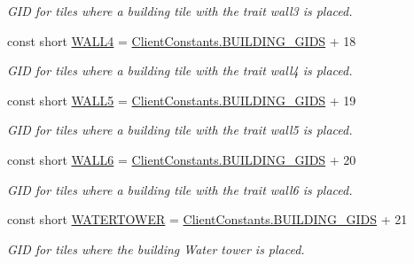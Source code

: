 \begin{DoxyCompactItemize}
\begin{DoxyCompactList}\small\item\em G\+I\+D for tiles where a building tile with the trait wall3 is placed. \end{DoxyCompactList}\item 
const short \hyperlink{classClient_1_1Common_1_1Constants_1_1BuildingGid_ae32db2141c8c89a5f169013d288bbaa6}{W\+A\+L\+L4} = \hyperlink{classClient_1_1Common_1_1Constants_1_1ClientConstants_ad2e944ac733f952d3d0c2e24fe5d14ad}{Client\+Constants.\+B\+U\+I\+L\+D\+I\+N\+G\+\_\+\+G\+I\+D\+S} + 18
\begin{DoxyCompactList}\small\item\em G\+I\+D for tiles where a building tile with the trait wall4 is placed. \end{DoxyCompactList}\item 
const short \hyperlink{classClient_1_1Common_1_1Constants_1_1BuildingGid_a02ed00c8a873b948ddbc108e5f6a97a4}{W\+A\+L\+L5} = \hyperlink{classClient_1_1Common_1_1Constants_1_1ClientConstants_ad2e944ac733f952d3d0c2e24fe5d14ad}{Client\+Constants.\+B\+U\+I\+L\+D\+I\+N\+G\+\_\+\+G\+I\+D\+S} + 19
\begin{DoxyCompactList}\small\item\em G\+I\+D for tiles where a building tile with the trait wall5 is placed. \end{DoxyCompactList}\item 
const short \hyperlink{classClient_1_1Common_1_1Constants_1_1BuildingGid_af82da441a2417d681d62e1edf3da9a40}{W\+A\+L\+L6} = \hyperlink{classClient_1_1Common_1_1Constants_1_1ClientConstants_ad2e944ac733f952d3d0c2e24fe5d14ad}{Client\+Constants.\+B\+U\+I\+L\+D\+I\+N\+G\+\_\+\+G\+I\+D\+S} + 20
\begin{DoxyCompactList}\small\item\em G\+I\+D for tiles where a building tile with the trait wall6 is placed. \end{DoxyCompactList}\item 
const short \hyperlink{classClient_1_1Common_1_1Constants_1_1BuildingGid_a700ea8d166e5210b1dea7f42506df381}{W\+A\+T\+E\+R\+T\+O\+W\+E\+R} = \hyperlink{classClient_1_1Common_1_1Constants_1_1ClientConstants_ad2e944ac733f952d3d0c2e24fe5d14ad}{Client\+Constants.\+B\+U\+I\+L\+D\+I\+N\+G\+\_\+\+G\+I\+D\+S} + 21
\begin{DoxyCompactList}\small\item\em G\+I\+D for tiles where the building Water tower is placed. \end{DoxyCompactList}\item 

\end{DoxyCompactItemize}
